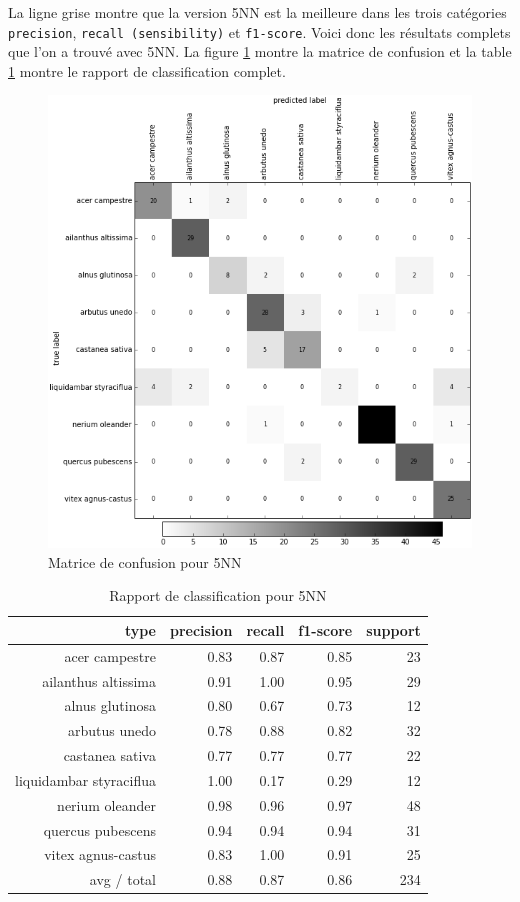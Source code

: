La ligne grise montre que la version 5NN est la meilleure dans les trois catégories \texttt{precision}, \texttt{recall (sensibility)} et \texttt{f1-score}. Voici donc les résultats complets que l'on a trouvé avec 5NN. La figure \ref{5nnconfusionmatrix} montre la matrice de confusion et la table \ref{5nnclassificationreport} montre le rapport de classification complet.

\begin{figure}[h]
  \centering
    \includegraphics[width=0.6\linewidth]{img/5NN.png}
  \caption{Matrice de confusion pour 5NN}
  \label{5nnconfusionmatrix}
\end{figure}

\begin{table}[h]
  \centering
  \footnotesize
  \begin{tabular}{|r|r|r|r|r|}  
    \hline
    type & precision & recall & f1-score & support\\
    \hline
    acer campestre & 0.83 & 0.87 & 0.85 & 23\\
    ailanthus altissima & 0.91 & 1.00 & 0.95 & 29\\
    alnus glutinosa & 0.80 & 0.67 & 0.73 & 12\\
    arbutus unedo & 0.78 & 0.88 & 0.82 & 32\\
    castanea sativa & 0.77 & 0.77 & 0.77 & 22\\
    liquidambar styraciflua & 1.00 & 0.17 & 0.29 & 12\\
    nerium oleander & 0.98 & 0.96 & 0.97 & 48\\
    quercus pubescens & 0.94 & 0.94 & 0.94 & 31\\
    vitex agnus-castus & 0.83 & 1.00 & 0.91 & 25\\
    \hline
    avg / total & 0.88 & 0.87 & 0.86 & 234\\
    \hline
  \end{tabular}
  \label{5nnclassificationreport}
  \caption{Rapport de classification pour 5NN}
\end{table}


